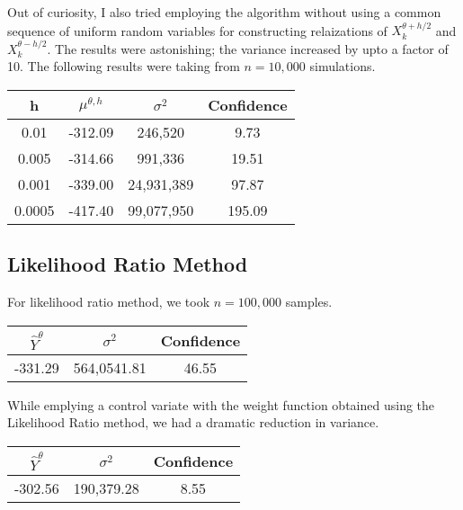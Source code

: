 Out of curiosity, I also tried employing the algorithm without using a
common sequence of uniform random variables for constructing
relaizations of \(X^{\theta + h/2}_k\) and \(X^{\theta - h/2}_k\). The
results were astonishing; the variance increased by upto a factor of 10.
The following results were taking from \(n = 10,000\) simulations.

\begin{longtable}[]{@{}cccc@{}}
\toprule
h & \(\mu^{\theta, h}\) & \(\sigma^2\) & Confidence\tabularnewline
\midrule
\endhead
0.01 & -312.09 & 246,520 & 9.73\tabularnewline
0.005 & -314.66 & 991,336 & 19.51\tabularnewline
0.001 & -339.00 & 24,931,389 & 97.87\tabularnewline
0.0005 & -417.40 & 99,077,950 & 195.09\tabularnewline
\bottomrule
\end{longtable}

\subsection{Likelihood Ratio Method}\label{likelihood-ratio-method}

For likelihood ratio method, we took \(n = 100,000\) samples.

\begin{longtable}[]{@{}ccc@{}}
\toprule
\(\hat Y^{\theta}\) & \(\sigma^2\) & Confidence\tabularnewline
\midrule
\endhead
-331.29 & 564,0541.81 & 46.55\tabularnewline
\bottomrule
\end{longtable}

While emplying a control variate with the weight function obtained using
the Likelihood Ratio method, we had a dramatic reduction in variance.

\begin{longtable}[]{@{}ccc@{}}
\toprule
\(\hat Y^\theta\) & \(\sigma^2\) & Confidence\tabularnewline
\midrule
\endhead
-302.56 & 190,379.28 & 8.55\tabularnewline
\bottomrule
\end{longtable}
